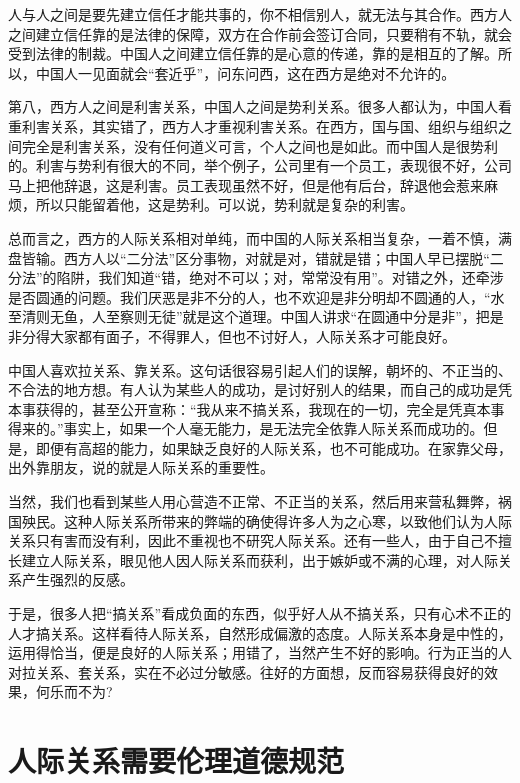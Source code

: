 \documentclass[fontset=fandol, a4paper, 12pt, openright]{ctexbook}
\begin{document}
人与人之间是要先建立信任才能共事的，你不相信别人，就无法与其合作。西方人之间建立信任靠的是法律的保障，双方在合作前会签订合同，只要稍有不轨，就会受到法律的制裁。中国人之间建立信任靠的是心意的传递，靠的是相互的了解。所以，中国人一见面就会“套近乎”，问东问西，这在西方是绝对不允许的。

第八，西方人之间是利害关系，中国人之间是势利关系。很多人都认为，中国人看重利害关系，其实错了，西方人才重视利害关系。在西方，国与国、组织与组织之间完全是利害关系，没有任何道义可言，个人之间也是如此。而中国人是很势利的。利害与势利有很大的不同，举个例子，公司里有一个员工，表现很不好，公司马上把他辞退，这是利害。员工表现虽然不好，但是他有后台，辞退他会惹来麻烦，所以只能留着他，这是势利。可以说，势利就是复杂的利害。

总而言之，西方的人际关系相对单纯，而中国的人际关系相当复杂，一着不慎，满盘皆输。西方人以“二分法”区分事物，对就是对，错就是错；中国人早已摆脱“二分法”的陷阱，我们知道“错，绝对不可以；对，常常没有用”。对错之外，还牵涉是否圆通的问题。我们厌恶是非不分的人，也不欢迎是非分明却不圆通的人，“水至清则无鱼，人至察则无徒”就是这个道理。中国人讲求“在圆通中分是非”，把是非分得大家都有面子，不得罪人，但也不讨好人，人际关系才可能良好。

中国人喜欢拉关系、靠关系。这句话很容易引起人们的误解，朝坏的、不正当的、不合法的地方想。有人认为某些人的成功，是讨好别人的结果，而自己的成功是凭本事获得的，甚至公开宣称：“我从来不搞关系，我现在的一切，完全是凭真本事得来的。”事实上，如果一个人毫无能力，是无法完全依靠人际关系而成功的。但是，即便有高超的能力，如果缺乏良好的人际关系，也不可能成功。在家靠父母，出外靠朋友，说的就是人际关系的重要性。

当然，我们也看到某些人用心营造不正常、不正当的关系，然后用来营私舞弊，祸国殃民。这种人际关系所带来的弊端的确使得许多人为之心寒，以致他们认为人际关系只有害而没有利，因此不重视也不研究人际关系。还有一些人，由于自己不擅长建立人际关系，眼见他人因人际关系而获利，出于嫉妒或不满的心理，对人际关系产生强烈的反感。

于是，很多人把“搞关系”看成负面的东西，似乎好人从不搞关系，只有心术不正的人才搞关系。这样看待人际关系，自然形成偏激的态度。人际关系本身是中性的，运用得恰当，便是良好的人际关系；用错了，当然产生不好的影响。行为正当的人对拉关系、套关系，实在不必过分敏感。往好的方面想，反而容易获得良好的效果，何乐而不为?

\section{人际关系需要伦理道德规范}
\end{document}
